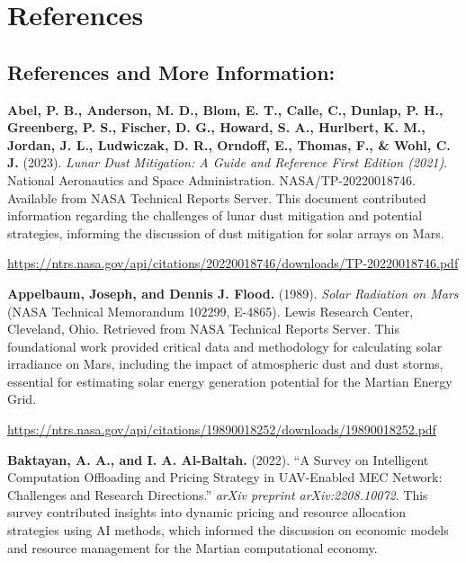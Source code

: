 \documentclass[fontsize=10pt, oneside, DIV=calc]{scrartcl}
\begin{document}
            
\section*{References}



\subsection*{References and More Information:}



\noindent \textbf{Abel, P. B., Anderson, M. D., Blom, E. T., Calle, C., Dunlap, P. H., Greenberg, P. S., Fischer, D. G., Howard, S. A., Hurlbert, K. M., Jordan, J. L., Ludwiczak, D. R., Orndoff, E., Thomas, F., \& Wohl, C. J.} (2023). \textit{Lunar Dust Mitigation: A Guide and Reference First Edition (2021)}. National Aeronautics and Space Administration. NASA/TP-20220018746. Available from NASA Technical Reports Server. This document contributed information regarding the challenges of lunar dust mitigation and potential strategies, informing the discussion of dust mitigation for solar arrays on Mars. 



\href{https://ntrs.nasa.gov/api/citations/20220018746/downloads/TP-20220018746.pdf}{\url{https://ntrs.nasa.gov/api/citations/20220018746/downloads/TP-20220018746.pdf}}

\vspace{1em}
\noindent \textbf{Appelbaum, Joseph, and Dennis J. Flood.} (1989). \textit{Solar Radiation on Mars} (NASA Technical Memorandum 102299, E-4865). Lewis Research Center, Cleveland, Ohio. Retrieved from NASA Technical Reports Server. This foundational work provided critical data and methodology for calculating solar irradiance on Mars, including the impact of atmospheric dust and dust storms, essential for estimating solar energy generation potential for the Martian Energy Grid. 



\href{https://ntrs.nasa.gov/api/citations/19890018252/downloads/19890018252.pdf}{\url{https://ntrs.nasa.gov/api/citations/19890018252/downloads/19890018252.pdf}}

\vspace{1em}
\noindent \textbf{Baktayan, A. A., and I. A. Al-Baltah.} (2022). ``A Survey on Intelligent Computation Offloading and Pricing Strategy in UAV-Enabled MEC Network: Challenges and Research Directions.'' \textit{arXiv preprint arXiv:2208.10072}. This survey contributed insights into dynamic pricing and resource allocation strategies using AI methods, which informed the discussion on economic models and resource management for the Martian computational economy. 
\end{document}
